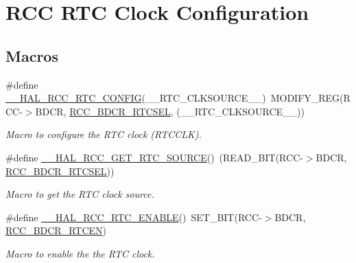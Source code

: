 \hypertarget{group___r_c_c___r_t_c___clock___configuration}{}\section{R\+CC R\+TC Clock Configuration}
\label{group___r_c_c___r_t_c___clock___configuration}
\subsection*{Macros}
\begin{DoxyCompactItemize}
\item 
\#define \hyperlink{group___r_c_c___r_t_c___clock___configuration_ga2d6c4c7e951bfd007d26988fbfe6eaa4}{\+\_\+\+\_\+\+H\+A\+L\+\_\+\+R\+C\+C\+\_\+\+R\+T\+C\+\_\+\+C\+O\+N\+F\+IG}(\+\_\+\+\_\+\+R\+T\+C\+\_\+\+C\+L\+K\+S\+O\+U\+R\+C\+E\+\_\+\+\_\+)~M\+O\+D\+I\+F\+Y\+\_\+\+R\+EG(R\+CC-\/$>$B\+D\+CR, \hyperlink{group___peripheral___registers___bits___definition_gabe30dbd38f6456990ee641648bc05d40}{R\+C\+C\+\_\+\+B\+D\+C\+R\+\_\+\+R\+T\+C\+S\+EL}, (\+\_\+\+\_\+\+R\+T\+C\+\_\+\+C\+L\+K\+S\+O\+U\+R\+C\+E\+\_\+\+\_\+))
\begin{DoxyCompactList}\small\item\em Macro to configure the R\+TC clock (R\+T\+C\+C\+LK). \end{DoxyCompactList}\item 
\#define \hyperlink{group___r_c_c___r_t_c___clock___configuration_gad40d00ff1c984ebd011ea9f6e7f93c44}{\+\_\+\+\_\+\+H\+A\+L\+\_\+\+R\+C\+C\+\_\+\+G\+E\+T\+\_\+\+R\+T\+C\+\_\+\+S\+O\+U\+R\+CE}()~(R\+E\+A\+D\+\_\+\+B\+IT(R\+CC-\/$>$B\+D\+CR, \hyperlink{group___peripheral___registers___bits___definition_gabe30dbd38f6456990ee641648bc05d40}{R\+C\+C\+\_\+\+B\+D\+C\+R\+\_\+\+R\+T\+C\+S\+EL}))
\begin{DoxyCompactList}\small\item\em Macro to get the R\+TC clock source. \end{DoxyCompactList}\item 
\#define \hyperlink{group___r_c_c___r_t_c___clock___configuration_gab7cc36427c31da645a0e38e181f8ce0f}{\+\_\+\+\_\+\+H\+A\+L\+\_\+\+R\+C\+C\+\_\+\+R\+T\+C\+\_\+\+E\+N\+A\+B\+LE}()~S\+E\+T\+\_\+\+B\+IT(R\+CC-\/$>$B\+D\+CR, \hyperlink{group___peripheral___registers___bits___definition_ga79ea6f2df75f09b17df9582037ed6a53}{R\+C\+C\+\_\+\+B\+D\+C\+R\+\_\+\+R\+T\+C\+EN})
\begin{DoxyCompactList}\small\item\em Macro to enable the the R\+TC clock. \end{DoxyCompactList}\item 

\end{DoxyCompactItemize}
